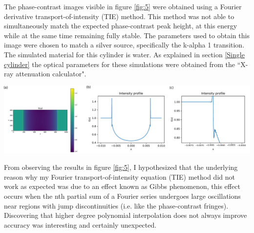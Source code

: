 \documentclass[10pt, a4paper, singlespacing]{report}
\newenvironment{Figure}
    {\par\medskip\noindent\minipage{\linewidth}}
    {\endminipage\par\medskip}
\begin{document}
The phase-contrast images visible in figure \ref{fig:5} were obtained using a Fourier derivative transport-of-intensity (TIE) method. This method was not able to simultaneously match the expected phase-contrast peak height, at this energy while at the same time remaining fully stable. The parameters used to obtain this image were chosen to match a silver source, specifically the k-alpha 1 transition. The simulated material for this cylinder is water. As explained in section \ref{Single cylinder} the optical parameters for these simulations were obtained from the ``X-ray attenuation calculator".
\begin{Figure}
\centering
\includegraphics[width=\linewidth]{Fourier_intensity_profile.pdf}
\label{fig:5}
\end{Figure}
From observing the results in figure \ref{fig:5}, I hypothesized that the underlying reason why my Fourier transport-of-intensity equation (TIE) method did not work as expected was due to an effect known as Gibbs phenomenon, this effect occurs when the nth partial sum of a Fourier series undergoes large oscillations near regions with jump discontinuities\cite{Gibbs} (i.e. like the phase-contrast fringes). Discovering that higher degree polynomial interpolation does not always improve accuracy was interesting and certainly unexpected.
\end{document}
